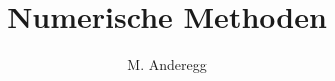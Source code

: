 \documentclass[a4paper, 11pt]{article}
\begin{document}
\title{Numerische Methoden}
\author{M. Anderegg}
\date{} %
\maketitle





\end{document}
